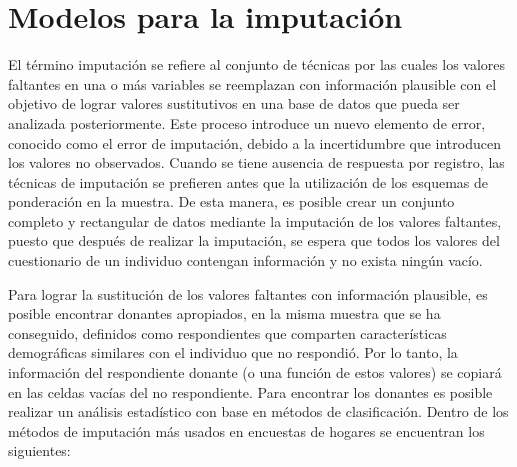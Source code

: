 \documentclass[
  12pt,
]{book}
\begin{document}
\hypertarget{modelos-para-la-imputaciuxf3n}{%
\section{Modelos para la imputación}\label{modelos-para-la-imputaciuxf3n}}

El término imputación se refiere al conjunto de técnicas por las cuales los valores faltantes en una o más variables se reemplazan con información plausible con el objetivo de lograr valores sustitutivos en una base de datos que pueda ser analizada posteriormente. Este proceso introduce un nuevo elemento de error, conocido como el error de imputación, debido a la incertidumbre que introducen los valores no observados. Cuando se tiene ausencia de respuesta por registro, las técnicas de imputación se prefieren antes que la utilización de los esquemas de ponderación en la muestra. De esta manera, es posible crear un conjunto completo y rectangular de datos mediante la imputación de los valores faltantes, puesto que después de realizar la imputación, se espera que todos los valores del cuestionario de un individuo contengan información y no exista ningún vacío.

Para lograr la sustitución de los valores faltantes con información plausible, es posible encontrar donantes apropiados, en la misma muestra que se ha conseguido, definidos como respondientes que comparten características demográficas similares con el individuo que no respondió. Por lo tanto, la información del respondiente donante (o una función de estos valores) se copiará en las celdas vacías del no respondiente. Para encontrar los donantes es posible realizar un análisis estadístico con base en métodos de clasificación. Dentro de los métodos de imputación más usados en encuestas de hogares se encuentran los siguientes:
\end{document}

